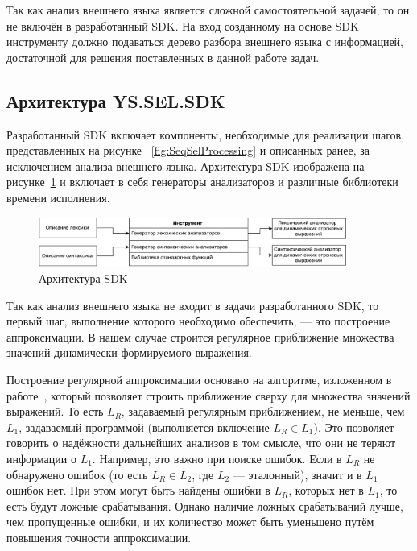 Так как анализ внешнего языка является сложной самостоятельной задачей, то он не включён в разработанный SDK. На вход созданному на основе SDK инструменту должно подаваться дерево разбора внешнего языка с информацией, достаточной для решения поставленных в данной работе задач. 


\subsection{Архитектура YS.SEL.SDK}

Разработанный SDK включает компоненты, необходимые для реализации шагов, представленных на рисунке ~\ref{fig:SeqSelProcessing} и описанных ранее, за исключением анализа внешнего языка. Архитектура SDK изображена на рисунке~\ref{fig:SDKHLArch} и включает в себя генераторы анализаторов и различные библиотеки времени исполнения.

\begin{figure}[h!]
\begin{center}
\includegraphics[width=0.9\textwidth]{pics/HighLevelArch}
\caption{Архитектура SDK}
\label{fig:SDKHLArch} 
\end{center}
\end{figure}

Так как анализ внешнего языка не входит в задачи разработанного SDK, то первый шаг, выполнение которого необходимо обеспечить, --- это построение аппроксимации. В нашем случае строится регулярное приближение множества значений динамически формируемого выражения.

Построение регулярной аппроксимации основано на алгоритме, изложенном в работе~\cite{RegOverApprox}, который позволяет строить приближение сверху для множества значений выражений. То есть $L_R$, задаваемый регулярным приближением, не меньше, чем $L_1$, задаваемый программой (выполняется включение $L_R \in L_1$). Это позволяет говорить о надёжности дальнейших анализов в том смысле, что они не теряют информации о $L_1$. Например, это важно при поиске ошибок. Если в $L_R$ не обнаружено ошибок (то есть $L_R \in L_2$, где $L_2$ --- эталонный), значит и в $L_1$ ошибок нет. При этом могут быть найдены ошибки в $L_R$, которых нет в $L_1$, то есть будут ложные срабатывания. Однако наличие ложных срабатываний лучше, чем пропущенные ошибки, и их количество может быть уменьшено путём повышения точности аппроксимации. 

